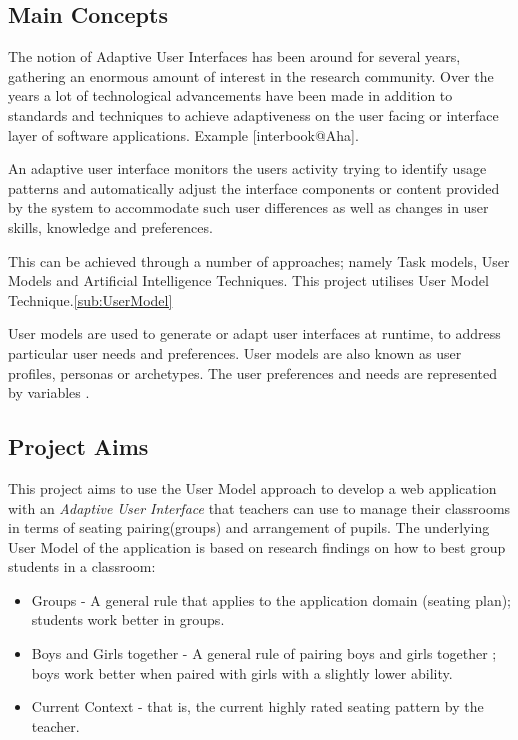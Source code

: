 \subsection{Main Concepts}
The notion of Adaptive User Interfaces has been around for several years, gathering an enormous amount of interest in the research community. Over the years a lot of technological advancements have been made in addition to standards and techniques to achieve adaptiveness on the user facing or interface layer of software applications. Example [interbook@Aha]. \cite{brusilovsky2007user} 

An adaptive user interface monitors the users activity trying to identify usage patterns and automatically adjust the interface components or content provided by the system to accommodate such user differences as well as changes in user skills, knowledge and preferences.\cite{alvarez2007current}

This can be achieved through a number of approaches; namely Task models, User Models and Artificial Intelligence Techniques. This project utilises User Model Technique.\ref{sub:UserModel} 

User models are used to generate or adapt user interfaces at runtime, to address particular user needs and preferences. User models are also known as user profiles, personas or archetypes. The user preferences and needs are represented by variables \cite{W3C}.

\subsection{Project Aims} \label{sub:projectAims}
This project aims to use the User Model approach to develop a web application with an \emph{Adaptive User Interface} that teachers can use to manage their classrooms in terms of seating pairing(groups) and arrangement of pupils. The underlying User Model of the application is based on research findings on how to best group students in a classroom:

\begin{itemize}
    \item Groups - A general rule that applies to the application domain (seating plan); students work better in groups.
    \item Boys and Girls together - A general rule of pairing boys and girls together ; boys work better when paired with girls with a slightly lower ability. \cite{OFSTED}
    \item Current Context - that is, the current highly rated seating pattern by the teacher. 
\end{itemize}

